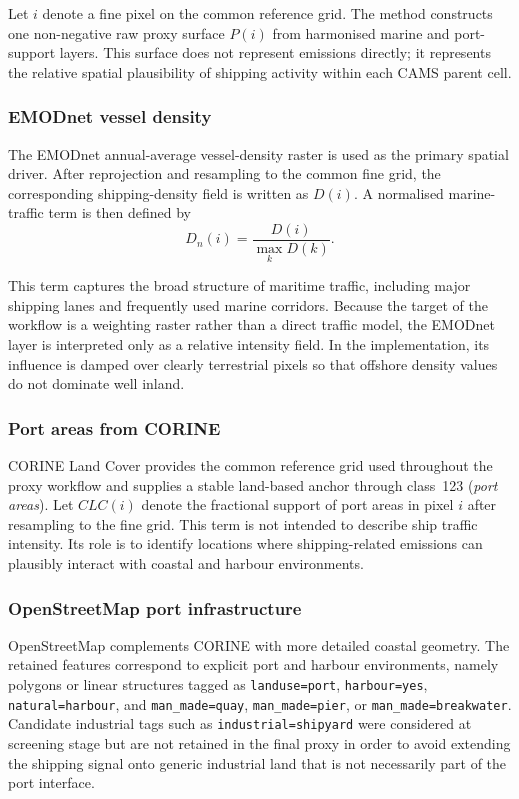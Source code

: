Let $i$ denote a fine pixel on the common reference grid. The method
constructs one non-negative raw proxy surface $P(i)$ from harmonised
marine and port-support layers. This surface does not represent
emissions directly; it represents the relative spatial plausibility of
shipping activity within each CAMS parent cell.

\subsubsection{EMODnet vessel density}

The EMODnet annual-average vessel-density raster is used as the primary
spatial driver. After reprojection and resampling to the common fine
grid, the corresponding shipping-density field is written as $D(i)$. A
normalised marine-traffic term is then defined by
\begin{equation}
  D_n(i) = \frac{D(i)}{\max_k D(k)}.
\end{equation}

This term captures the broad structure of maritime traffic, including
major shipping lanes and frequently used marine corridors. Because the
target of the workflow is a weighting raster rather than a direct traffic
model, the EMODnet layer is interpreted only as a relative intensity
field. In the implementation, its influence is damped over clearly
terrestrial pixels so that offshore density values do not dominate
well inland.

\subsubsection{Port areas from CORINE}

CORINE Land Cover provides the common reference grid used throughout the
proxy workflow and supplies a stable land-based anchor through class~123
(\emph{port areas}). Let $CLC(i)$ denote the fractional support of port
areas in pixel $i$ after resampling to the fine grid. This term is not
intended to describe ship traffic intensity. Its role is to identify
locations where shipping-related emissions can plausibly interact with
coastal and harbour environments.

\subsubsection{OpenStreetMap port infrastructure}

OpenStreetMap complements CORINE with more detailed coastal geometry. The
retained features correspond to explicit port and harbour environments,
namely polygons or linear structures tagged as \texttt{landuse=port},
\texttt{harbour=yes}, \texttt{natural=harbour}, and
\texttt{man\_made=quay}, \texttt{man\_made=pier}, or
\texttt{man\_made=breakwater}. Candidate industrial tags such as
\texttt{industrial=shipyard} were considered at screening stage but are
not retained in the final proxy in order to avoid extending the shipping
signal onto generic industrial land that is not necessarily part of the
port interface.

